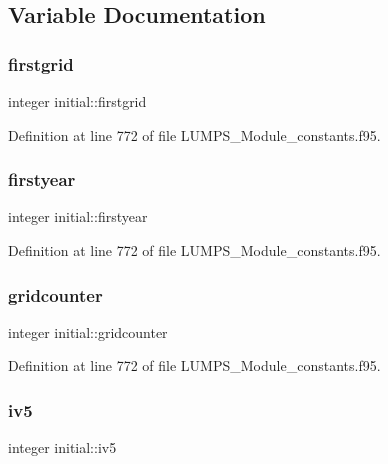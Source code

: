 \subsection{Variable Documentation}
\mbox{\label{namespaceinitial_aa3cbd56e6d33e03dc03b7b5fd49b98f6}} 
\subsubsection{\texorpdfstring{firstgrid}{firstgrid}}
{\footnotesize\ttfamily integer initial\+::firstgrid}



Definition at line 772 of file L\+U\+M\+P\+S\+\_\+\+Module\+\_\+constants.\+f95.

\mbox{\label{namespaceinitial_abea65826f68b663575b9a8373cce36e6}} 
\subsubsection{\texorpdfstring{firstyear}{firstyear}}
{\footnotesize\ttfamily integer initial\+::firstyear}



Definition at line 772 of file L\+U\+M\+P\+S\+\_\+\+Module\+\_\+constants.\+f95.

\mbox{\label{namespaceinitial_a285aa78da8f73cb954b61021b9761efc}} 
\subsubsection{\texorpdfstring{gridcounter}{gridcounter}}
{\footnotesize\ttfamily integer initial\+::gridcounter}



Definition at line 772 of file L\+U\+M\+P\+S\+\_\+\+Module\+\_\+constants.\+f95.

\mbox{\label{namespaceinitial_ac0085ee292167191015e55edc224e2d7}} 
\subsubsection{\texorpdfstring{iv5}{iv5}}
{\footnotesize\ttfamily integer initial\+::iv5}



